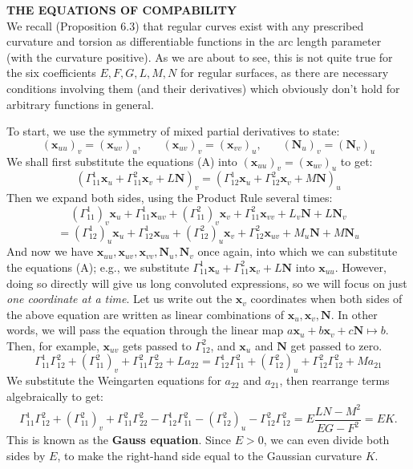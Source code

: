 \documentclass[leqno]{book}
\begin{document}
\noindent\textbf{THE EQUATIONS OF COMPABILITY}\\

\noindent We recall (Proposition 6.3) that regular curves exist with any prescribed curvature and torsion as differentiable functions in the arc length parameter (with the curvature positive).  As we are about to see, this is not quite true for the six coefficients $E,F,G,L,M,N$ for regular surfaces, as there are necessary conditions involving them (and their derivatives) which obviously don't hold for arbitrary functions in general.

To start, we use the symmetry of mixed partial derivatives to state:
$$(\mathbf x_{uu})_v=(\mathbf x_{uv})_u,~~~~~~~~(\mathbf x_{uv})_v=(\mathbf x_{vv})_u,~~~~~~~~(\mathbf N_u)_v=(\mathbf N_v)_u$$
We shall first substitute the equations (A) into $(\mathbf x_{uu})_v=(\mathbf x_{uv})_u$ to get:
$$\left(\Gamma_{11}^1\mathbf x_u+\Gamma_{11}^2\mathbf x_v+L\mathbf N\right)_v=\left(\Gamma_{12}^1\mathbf x_u+\Gamma_{12}^2\mathbf x_v+M\mathbf N\right)_u$$
Then we expand both sides, using the Product Rule several times:
$$(\Gamma_{11}^1)_v\mathbf x_u+\Gamma_{11}^1\mathbf x_{uv}+(\Gamma_{11}^2)_v\mathbf x_v+\Gamma_{11}^2\mathbf x_{vv}+L_v\mathbf N+L\mathbf N_v$$
$$=(\Gamma_{12}^1)_u\mathbf x_u+\Gamma_{12}^1\mathbf x_{uu}+(\Gamma_{12}^2)_u\mathbf x_v+\Gamma_{12}^2\mathbf x_{uv}+M_u\mathbf N+M\mathbf N_u$$
And now we have $\mathbf x_{uu},\mathbf x_{uv},\mathbf x_{vv},\mathbf N_u,\mathbf N_v$ once again, into which we can substitute the equations (A); e.g., we substitute $\Gamma_{11}^1\mathbf x_u+\Gamma_{11}^2\mathbf x_v+L\mathbf N$ into $\mathbf x_{uu}$. %
However, doing so directly will give us long convoluted expressions, so we will focus on just \emph{one coordinate at a time}.  Let us write out the $\mathbf x_v$ coordinates when both sides of the above equation are written as linear combinations of $\mathbf x_u,\mathbf x_v,\mathbf N$.  In other words, we will pass the equation through the linear map $a\mathbf x_u+b\mathbf x_v+c\mathbf N\mapsto b$.  Then, for example, $\mathbf x_{uv}$ gets passed to $\Gamma_{12}^2$, and $\mathbf x_u$ and $\mathbf N$ get passed to zero. %
$$\Gamma_{11}^1\Gamma_{12}^2+(\Gamma_{11}^2)_v+\Gamma_{11}^2\Gamma_{22}^2+La_{22}=\Gamma_{12}^1\Gamma_{11}^2+(\Gamma_{12}^2)_u+\Gamma_{12}^2\Gamma_{12}^2+Ma_{21}$$
We substitute the Weingarten equations for $a_{22}$ and $a_{21}$, then rearrange terms algebraically to get:
$$\Gamma_{11}^1\Gamma_{12}^2+(\Gamma_{11}^2)_v+\Gamma_{11}^2\Gamma_{22}^2-\Gamma_{12}^1\Gamma_{11}^2-(\Gamma_{12}^2)_u-\Gamma_{12}^2\Gamma_{12}^2=E\frac{LN-M^2}{EG-F^2}=EK.$$
This is known as the \textbf{Gauss equation}.  Since $E>0$, we can even divide both sides by $E$, to make the right-hand side equal to the Gaussian curvature $K$.
\end{document}
